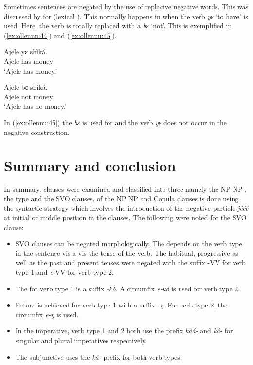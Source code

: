 \documentclass[output=paper,newtxmath,modfonts,nonflat,hidelinks]{langsci/langscibook}
\begin{document}
Sometimes sentences are negated by the use of replacive negative words. This was discussed by \citet[23]{caesar2012} for  (lexical ). This normally happens in  when the verb \textit{yɛ} `to have' is used. Here, the verb is totally replaced with a  \textit{bɛ} `not'. This is exemplified in (\ref{ex:ollennu:44}) and (\ref{ex:ollennu:45}).


\ea \label{ex:ollennu:44}
\gll Ajele yɛ shìká.\\
Ajele has money\\
\glt `Ajele has money.'
\z


\ea \label{ex:ollennu:45}
\gll Ajele bɛ shíká.\\
Ajele not money\\
\glt`Ajele has no money.'
\z


In (\ref{ex:ollennu:45}) the  \textit{bɛ} is used for  and the verb \textit{yɛ} does not occur in the negative construction.

\section{\label{sec:ollennu:3} Summary and conclusion}

In summary,  clauses were examined and classified into three namely the NP NP , the  type and the SVO clauses.  of the NP NP and Copula clauses is done using the syntactic strategy which involves the introduction of the {negative particle} \textit{jééé} at initial or middle position in the clauses. The following were noted for the SVO clause:
\begin{itemize}
\item {} SVO clauses can be negated morphologically. The  depends on the verb type in the sentence vis-a-vis the tense of the verb. The habitual, progressive as well as the past and present tenses were negated with the suffix -VV for verb type 1 and \textit{e}-VV for verb type 2.

\item The   for verb type 1 is a suffix \textit{-kò}. A circumfix \textit{e-kò} is used for verb type 2.

\item Future  is achieved for verb type 1 with a suffix \textit{-ŋ}. For verb type 2, the circumfix \textit{e-ŋ} is used.

\item In the imperative, verb type 1 and 2 both use the prefix \textit{kàá-} and \textit{ká-} for singular and plural imperatives respectively.

\item The subjunctive  uses the \textit{ká-} prefix for both verb types.
\end{itemize}
\end{document}
